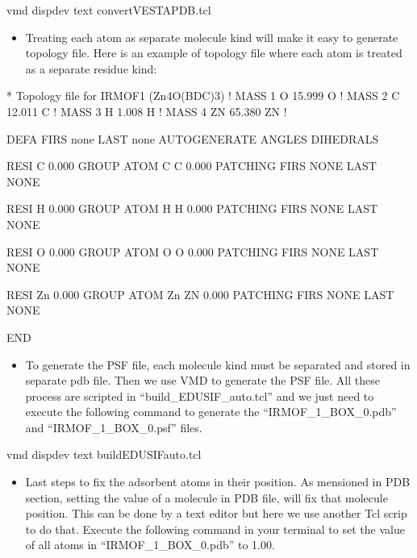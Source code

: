 \documentclass[letterpaper,10pt,english]{sphinxmanual}
\begin{document}
\begin{enumerate}
\begin{itemize}
\end{itemize}

\begin{sphinxVerbatim}[commandchars=\\\{\}]
vmd \PYGZhy{}dispdev text \PYGZlt{} convert\PYGZus{}VESTA\PYGZus{}PDB.tcl
\end{sphinxVerbatim}
\begin{itemize}
\item {} 
\sphinxAtStartPar
Treating each atom as separate molecule kind will make it easy to generate topology file. Here is an example of topology file where each atom is treated
as a separate residue kind:

\end{itemize}

\begin{sphinxVerbatim}[commandchars=\\\{\}]
* Topology file for IRMOF\PYGZhy{}1 (Zn4O(BDC)3)
!
MASS   1  O     15.999      O  !
MASS   2  C     12.011      C  !
MASS   3  H      1.008      H  !
MASS   4  ZN    65.380      ZN !

DEFA FIRS none LAST none
AUTOGENERATE ANGLES DIHEDRALS

RESI    C         0.000
GROUP
ATOM    C   C     0.000
PATCHING FIRS NONE LAST NONE

RESI    H         0.000
GROUP
ATOM    H   H     0.000
PATCHING FIRS NONE LAST NONE

RESI    O          0.000
GROUP
ATOM    O   O      0.000
PATCHING FIRS NONE LAST NONE

RESI    Zn         0.000
GROUP
ATOM    Zn  ZN     0.000
PATCHING FIRS NONE LAST NONE

END
\end{sphinxVerbatim}
\begin{itemize}
\item {} 
\sphinxAtStartPar
To generate the PSF file, each molecule kind must be separated and stored in separate pdb file. Then we use VMD to generate the PSF file.
All these process are scripted in “build\_EDUSIF\_auto.tcl” and we just need to execute the following command to generate the “IRMOF\_1\_BOX\_0.pdb” and
“IRMOF\_1\_BOX\_0.psf” files.

\end{itemize}

\begin{sphinxVerbatim}[commandchars=\\\{\}]
vmd \PYGZhy{}dispdev text \PYGZlt{} build\PYGZus{}EDUSIF\PYGZus{}auto.tcl
\end{sphinxVerbatim}
\begin{itemize}
\item {} 
\sphinxAtStartPar
Last steps to fix the adsorbent atoms in their position. As mensioned in PDB section, setting the  value of a molecule in PDB file, will
fix that molecule position. This can be done by a text editor but here we use another Tcl scrip to do that. Execute the following command in your terminal
to set the  value of all atoms in “IRMOF\_1\_BOX\_0.pdb” to 1.00.


\end{itemize}
\end{enumerate}
\end{document}
